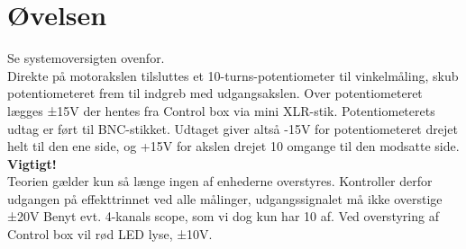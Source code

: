 \documentclass[]{report}
\begin{document}
\section{Øvelsen}
Se systemoversigten ovenfor.\\

\noindent Direkte på motorakslen tilsluttes et 10-turns-potentiometer til vinkelmåling, skub potentiometeret frem til indgreb med udgangsakslen. Over potentiometeret lægges ±15V der hentes fra Control box via mini XLR-stik. Potentiometerets udtag er ført til BNC-stikket. Udtaget giver altså -15V for potentiometeret drejet helt til den ene side, og +15V for akslen drejet 10 omgange til den modsatte side.\\
\newline \textbf{Vigtigt!} \\
Teorien gælder kun så længe ingen af enhederne overstyres. Kontroller derfor udgangen på effekttrinnet ved alle målinger, udgangssignalet må ikke overstige ±20V
Benyt evt. 4-kanals scope, som vi dog kun har 10 af. Ved overstyring af Control box vil rød LED lyse, ±10V.
\end{document}
